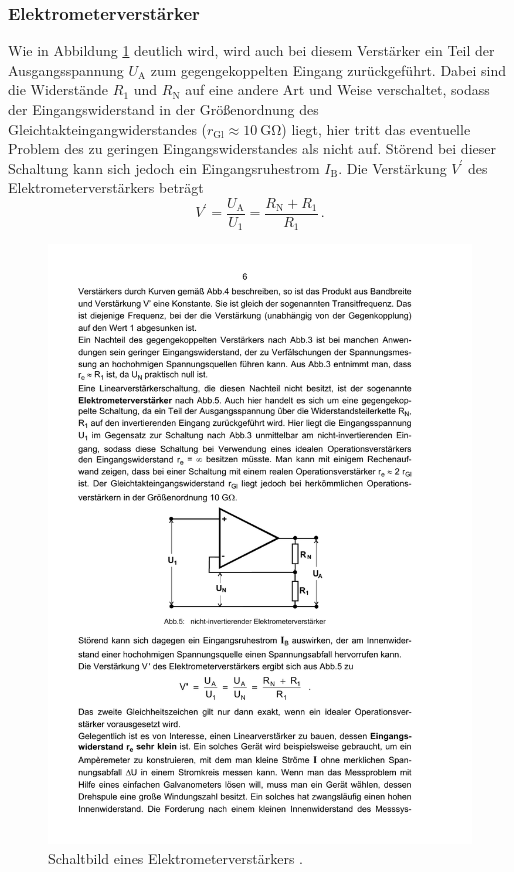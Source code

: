 \subsubsection{Elektrometerverstärker}
\label{subsubsec:elektrometerverstärker}
Wie in Abbildung \ref{fig:elektrometer} deutlich wird, wird auch bei diesem
Verstärker ein Teil der Ausgangsspannung $U_\text{A}$ zum gegengekoppelten
Eingang zurückgeführt. Dabei sind die Widerstände $R_1$ und $R_\text{N}$ auf
eine andere Art und Weise verschaltet, sodass der Eingangswiderstand in der
Größenordnung des Gleichtakteingangwiderstandes
($r_\text{Gl} \approx \SI{10}{\giga\ohm}$) liegt, hier tritt das eventuelle
Problem des zu geringen Eingangswiderstandes als nicht auf.
Störend bei dieser Schaltung kann sich jedoch ein Eingangsruhestrom
$I_\text{B}$.
Die Verstärkung $V^\prime$ des Elektrometerverstärkers beträgt
\begin{equation*}
    V^\prime = \frac{U_\text{A}}{U_1} = \frac{R_\text{N} + R_1}{R_1}\,.
\end{equation*}
\begin{figure}
    \centering
    \includegraphics[width=0.5\linewidth]{img/elektrometer.pdf}
    \caption{Schaltbild eines Elektrometerverstärkers \cite{V51}.}
    \label{fig:elektrometer}
\end{figure}

